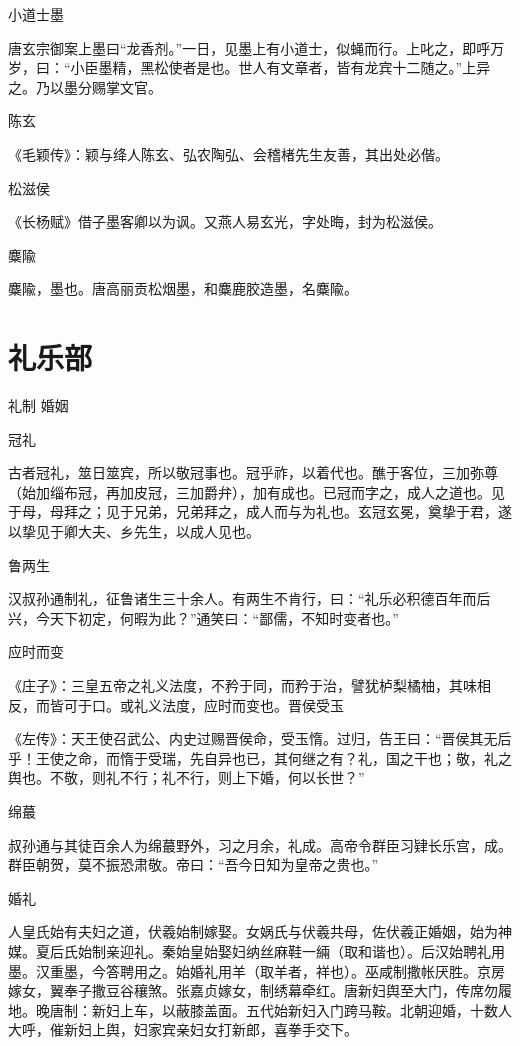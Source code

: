 \documentclass[a4paper,12pt,UTF8,twoside]{ctexbook}
\begin{document}
    小道士墨
    
    唐玄宗御案上墨曰“龙香剂。”一日，见墨上有小道士，似蝇而行。上叱之，即呼万岁，曰：“小臣墨精，黑松使者是也。世人有文章者，皆有龙宾十二随之。”上异之。乃以墨分赐掌文官。
    
    陈玄
    
    《毛颖传》：颖与绛人陈玄、弘农陶弘、会稽楮先生友善，其出处必偕。
    
    松滋侯
    
    《长杨赋》借子墨客卿以为讽。又燕人易玄光，字处晦，封为松滋侯。
    
    麋隃
    
    麋隃，墨也。唐高丽贡松烟墨，和麋鹿胶造墨，名麋隃。
    
    
    
    \part{礼乐部}
    
    礼制 婚姻
    
    冠礼
    
    古者冠礼，筮日筮宾，所以敬冠事也。冠乎祚，以着代也。醮于客位，三加弥尊（始加缁布冠，再加皮冠，三加爵弁），加有成也。已冠而字之，成人之道也。见于母，母拜之；见于兄弟，兄弟拜之，成人而与为礼也。玄冠玄冕，奠挚于君，遂以挚见于卿大夫、乡先生，以成人见也。
    
    鲁两生
    
    汉叔孙通制礼，征鲁诸生三十余人。有两生不肯行，曰：“礼乐必积德百年而后兴，今天下初定，何暇为此？”通笑曰：“鄙儒，不知时变者也。”
    
    应时而变
    
    《庄子》：三皇五帝之礼义法度，不矜于同，而矜于治，譬犹栌梨橘柚，其味相反，而皆可于口。或礼义法度，应时而变也。晋侯受玉
    
    《左传》：天王使召武公、内史过赐晋侯命，受玉惰。过归，告王曰：“晋侯其无后乎！王使之命，而惰于受瑞，先自异也已，其何继之有？礼，国之干也；敬，礼之舆也。不敬，则礼不行；礼不行，则上下婚，何以长世？”
    
    绵蕞
    
    叔孙通与其徒百余人为绵蕞野外，习之月余，礼成。高帝令群臣习肄长乐宫，成。群臣朝贺，莫不振恐肃敬。帝曰：“吾今日知为皇帝之贵也。”
    
    婚礼
    
    人皇氏始有夫妇之道，伏羲始制嫁娶。女娲氏与伏羲共母，佐伏羲正婚姻，始为神媒。夏后氏始制亲迎礼。秦始皇始娶妇纳丝麻鞋一緉（取和谐也）。后汉始聘礼用墨。汉重墨，今答聘用之。始婚礼用羊（取羊者，祥也）。巫咸制撒帐厌胜。京房嫁女，翼奉子撒豆谷穰煞。张嘉贞嫁女，制绣幕牵红。唐新妇舆至大门，传席勿履地。晚唐制：新妇上车，以蔽膝盖面。五代始新妇入门跨马鞍。北朝迎婚，十数人大呼，催新妇上舆，妇家宾亲妇女打新郎，喜拳手交下。
    
\end{document}
